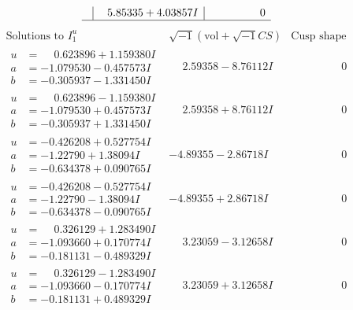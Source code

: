 \documentclass[1p]{elsarticle_modified}
\theoremstyle{definition}
\newcommand{\I}{\sqrt{-1}}
\begin{document}
$$\begin{array}{c|c|c}
 & \phantom{-}5.85335 + 4.03857 I & \phantom{-0.000000 } 0\\
 \hline 
 \end{array}$$\newpage$$\begin{array}{c|c|c}  
\text{Solutions to }I^u_{1}& \I (\text{vol} + \sqrt{-1}CS) & \text{Cusp shape}\\
 \hline 
\begin{aligned}
u &= \phantom{-}0.623896 + 1.159380 I \\
a &= -1.079530 - 0.457573 I \\
b &= -0.305937 - 1.331450 I\end{aligned}
 & \phantom{-}2.59358 - 8.76112 I & \phantom{-0.000000 } 0 \\ \hline\begin{aligned}
u &= \phantom{-}0.623896 - 1.159380 I \\
a &= -1.079530 + 0.457573 I \\
b &= -0.305937 + 1.331450 I\end{aligned}
 & \phantom{-}2.59358 + 8.76112 I & \phantom{-0.000000 } 0 \\ \hline\begin{aligned}
u &= -0.426208 + 0.527754 I \\
a &= -1.22790 + 1.38094 I \\
b &= -0.634378 + 0.090765 I\end{aligned}
 & -4.89355 - 2.86718 I & \phantom{-0.000000 } 0 \\ \hline\begin{aligned}
u &= -0.426208 - 0.527754 I \\
a &= -1.22790 - 1.38094 I \\
b &= -0.634378 - 0.090765 I\end{aligned}
 & -4.89355 + 2.86718 I & \phantom{-0.000000 } 0 \\ \hline\begin{aligned}
u &= \phantom{-}0.326129 + 1.283490 I \\
a &= -1.093660 + 0.170774 I \\
b &= -0.181131 - 0.489329 I\end{aligned}
 & \phantom{-}3.23059 - 3.12658 I & \phantom{-0.000000 } 0 \\ \hline\begin{aligned}
u &= \phantom{-}0.326129 - 1.283490 I \\
a &= -1.093660 - 0.170774 I \\
b &= -0.181131 + 0.489329 I\end{aligned}
 & \phantom{-}3.23059 + 3.12658 I & \phantom{-0.000000 } 0 \\ \hline\begin{aligned}

\end{aligned}
\end{array}$$
\end{document}
